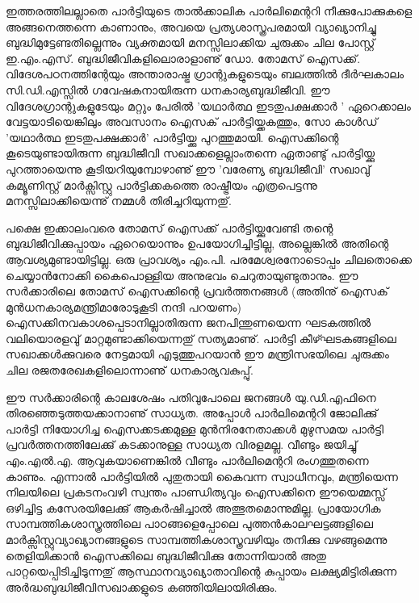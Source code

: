 ഇത്തരത്തിലല്ലാതെ പാര്‍ട്ടിയുടെ താല്‍ക്കാലിക പാര്‍ലിമെന്ററി നീക്കുപോക്കുകളെ അങ്ങനെത്തന്നെ കാണാനും,
അവയെ പ്രത്യശാസ്ത്രപരമായി വ്യാഖ്യാനിച്ചു ബുദ്ധിമുട്ടേണ്ടതില്ലെന്നും വ്യക്തമായി മനസ്സിലാക്കിയ ചുരുക്കം ചില പോസ്റ്റ്
ഇ.എം.എസ്. ബുദ്ധിജീവികളിലൊരാളാണു് ഡോ. തോമസ് ഐസക്ക്. വിദേശപഠനത്തിന്റേയും അന്താരാഷ്ട്ര ഗ്രാന്റുകളുടെയും
ബലത്തില്‍ ദീര്‍ഘകാലം സി.ഡി.എസ്സില്‍ ഗവേഷകനായിരുന്ന ധനകാര്യബുദ്ധിജീവി. ഈ വിദേശഗ്രാന്റുകളുടേയും മറ്റും 
പേരില്‍ 'യഥാര്‍ത്ഥ ഇടതുപക്ഷക്കാര്‍ ' ഏറെക്കാലം വേട്ടയാടിയെങ്കിലും അവസാനം ഐസക് പാര്‍ട്ടിയ്ക്കകത്തും, സോ 
കാള്‍ഡ് 'യഥാര്‍ത്ഥ ഇടതുപക്ഷക്കാര്‍' പാര്‍ട്ടിയ്ക്കു പുറത്തുമായി. ഐസക്കിന്റെ കൂടെയുണ്ടായിരുന്ന ബുദ്ധിജീവി 
സഖാക്കളെല്ലാംതന്നെ ഏതാണ്ടു് പാര്‍ട്ടിയ്ക്കു പുറത്തായെന്നു കൂടിയറിയുമ്പോഴാണു് ഈ 'വരേണ്യ ബുദ്ധിജീവി' സഖാവു് 
കമ്യൂണിസ്റ്റ് മാര്‍ക്സിസ്റ്റു പാര്‍ട്ടിക്കകത്തെ രാഷ്ട്രീയം എത്രപെട്ടന്നു മനസ്സിലാക്കിയെന്നു് നമ്മള്‍ തിരിച്ചറിയുന്നതു്.

പക്ഷെ ഇക്കാലംവരെ തോമസ് ഐസക്ക് പാര്‍ട്ടിയ്ക്കുവേണ്ടി തന്റെ ബുദ്ധിജീവിക്കുപ്പായം ഏറെയൊന്നും ഉപയോഗിച്ചിട്ടില്ല, 
അല്ലെങ്കില്‍ അതിന്റെ ആവശ്യമുണ്ടായിട്ടില്ല. ഒരു പ്രാവശ്യം എം.പി. പരമേശ്വരനോടൊപ്പം ചിലതൊക്കെ ചെയ്യാന്‍നോക്കി
കൈപൊള്ളിയ അനുഭവം ചെറുതായുണ്ടുതാനും. ഈ സര്‍ക്കാരിലെ തോമസ് ഐസക്കിന്റെ പ്രവര്‍ത്തനങ്ങള്‍ (അതിനു്
ഐസക് മുന്‍ധനകാര്യമന്ത്രിമാരോടുകൂടി നന്ദി പറയണം) ഐസക്കിനവകാശപ്പെടാനില്ലാതിരുന്ന ജനപിന്തുണയെന്ന 
ഘടകത്തില്‍ വലിയൊരളവു് മാറ്റമുണ്ടാക്കിയെന്നതു് സത്യമാണു്. പാര്‍ട്ടി കീഴ്ഘടകങ്ങളിലെ സഖാക്കള്‍ക്കുവരെ നേട്ടമായി
എടുത്തുപറയാന്‍ ഈ മന്ത്രിസഭയിലെ ചുരുക്കം ചില രജതരേഖകളിലൊന്നാണു് ധനകാര്യവകുപ്പു്.

ഈ സര്‍ക്കാരിന്റെ കാലശേഷം പതിവുപോലെ ജനങ്ങള്‍ യു.ഡി.എഫിനെ തിരഞ്ഞെടുത്തയക്കാനാണു് സാധ്യത. അപ്പോള്‍
പാര്‍ലിമെന്ററി ജോലിക്കു് പാര്‍ട്ടി നിയോഗിച്ച ഐസക്കടക്കമുള്ള മുന്‍നിരനേതാക്കള്‍ മുഴുസമയ പാര്‍ട്ടി 
പ്രവര്‍ത്തനത്തിലേക്കു് കടക്കാനുള്ള സാധ്യത വിരളമല്ല. വീണ്ടും ജയിച്ചു് എം.എല്‍.എ. ആവുകയാണെങ്കില്‍ വീണ്ടും 
പാര്‍ലിമെന്ററി രംഗത്തുതന്നെ കാണും. എന്നാല്‍ പാര്‍ട്ടിയില്‍ പുതുതായി കൈവന്ന സ്വാധീനവും, മന്ത്രിയെന്ന നിലയിലെ 
പ്രകടനംവഴി സ്വന്തം പാണ്ഡിത്യവും ഐസക്കിനെ ഈയെമ്മസ്സ് ഒഴിച്ചിട്ട കസേരയിലേക്കു് ആകര്‍ഷിച്ചാല്‍
അത്ഭുതമൊന്നുമില്ല. പ്രായോഗിക സാമ്പത്തികശാസ്ത്രത്തിലെ പാഠങ്ങളെപ്പോലെ പുത്തന്‍കാലഘട്ടങ്ങളിലെ 
മാര്‍ക്സിസ്റ്റുവ്യാഖ്യാനങ്ങളുടെ സാമ്പത്തികശാസ്ത്രവഴിയും തനിക്കു വഴങ്ങുമെന്നു തെളിയിക്കാന്‍ ഐസക്കിലെ ബുദ്ധിജീവിക്കു തോന്നിയാല്‍ 
അതു പാറ്റയെപ്പിടിച്ചിടുന്നതു് ആസ്ഥാനവ്യാഖ്യാതാവിന്റെ കുപ്പായം ലക്ഷ്യമിട്ടിരിക്കുന്ന 
അര്‍ദ്ധബുദ്ധിജീവിസഖാക്കളുടെ കഞ്ഞിയിലായിരിക്കും.

